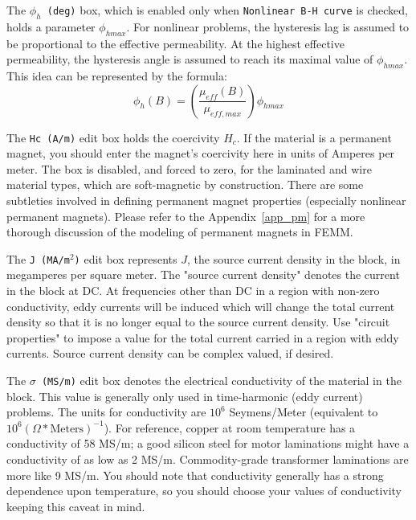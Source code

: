 \documentclass[12pt]{report}
\newcommand{\be}{\begin{equation}}
\newcommand{\ee}{\end{equation}}
\begin{document}
The {\tt $\phi_h$ (deg)} box, which is enabled only when
{\tt Nonlinear B-H curve} is checked, holds a parameter $\phi_{hmax}$.  For
nonlinear problems, the hysteresis lag is assumed to be proportional to the
effective permeability.  At the highest effective permeability, the
hysteresis angle is assumed to reach its maximal value of $\phi_{hmax}$.
This idea can be represented by the formula:
\be \phi_h(B)= \left( \frac{\mu_{eff}(B) }{\mu_{eff,max}} \right) \phi_{hmax} \ee


The {\tt Hc (A/m)} edit box holds the coercivity $H_c$.  If the material is
a permanent magnet, you should enter the magnet's coercivity here in units of
Amperes per meter.  The box is disabled, and forced to zero, for the laminated
and wire material types, which are soft-magnetic by construction.
There are some subtleties involved in defining
permanent magnet properties (especially nonlinear permanent magnets).
Please refer to the Appendix~\ref{app_pm} for a more thorough discussion of
the modeling of permanent magnets in FEMM.

The {\tt J (MA/m$^2$)} edit box represents $J$, the source current density in
the block, in megamperes per square meter. The "source current density"
denotes the current in the block at DC.  At frequencies other than DC in a region with non-zero conductivity,
eddy currents will be induced which will change the total current density so that it is no longer equal to the
source current density.  Use "circuit properties" to impose a value for the total current carried in a region
with eddy currents. Source current density can be complex valued, if desired.

The {\tt $\sigma$ (MS/m)} edit box denotes the electrical conductivity of the
material in the block. This value is generally only used in
time-harmonic (eddy current) problems. The units for conductivity
are $10^6$ Seymens/Meter (equivalent to $10^6
(\Omega*\mbox{Meters})^{-1}$). For reference, copper at room
temperature has a conductivity of 58 MS/m; a good silicon steel for
motor laminations might have a conductivity of as low as 2 MS/m.
Commodity-grade transformer laminations are more like 9 MS/m. You
should note that conductivity generally has a strong dependence
upon temperature, so you should choose your values of conductivity
keeping this caveat in mind.
\end{document}
